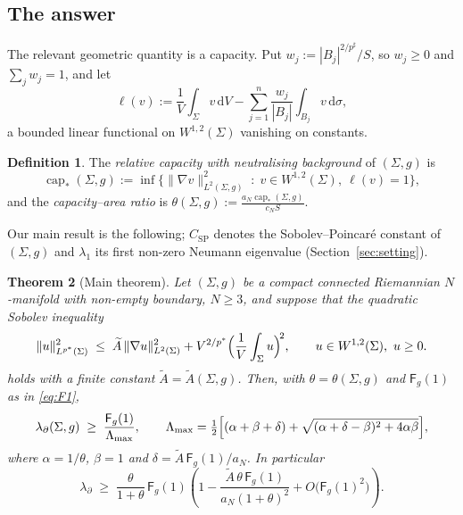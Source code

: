 \documentclass[11pt,reqno]{amsart}
\theoremstyle{plain}
\newtheorem{theorem}{Theorem}[section]
\theoremstyle{definition}
\newtheorem{definition}[theorem]{Definition}
\newcommand{\aN}{a_N}
\newcommand{\cN}{c_N}
\newcommand{\pstar}{p^{*}}
\newcommand{\psharp}{p^{\sharp}}
\newcommand{\cpstar}{\operatorname{cap}_{*}}
\newcommand{\Fq}{\mathsf{F}}
\newcommand{\Csp}{C_{\mathrm{SP}}}
\newcommand{\Atil}{\widetilde{A}}
\newcommand{\dd}{\,\mathrm{d}}
\begin{document}
\subsection{The answer}
The relevant geometric quantity is a capacity. Put
$w_j:=|B_j|^{2/\psharp}/S$, so $w_j\ge0$ and $\sum_jw_j=1$, and let
\begin{equation}
\label{eq:ell}
  \ell(v):=\frac1V\int_\Sigma v\dd V-\sum_{j=1}^{n}\frac{w_j}{|B_j|}\int_{B_j}v\dd\sigma ,
\end{equation}
a bounded linear functional on $W^{1,2}(\Sigma)$ vanishing on constants.

\begin{definition}
\label{def:capstar}
The \emph{relative capacity with neutralising background} of $(\Sigma,g)$ is
\begin{equation}
\label{eq:capstar}
  \cpstar(\Sigma,g):=\inf\bigl\{\|\nabla v\|^2_{L^2(\Sigma,g)}\;:\;
        v\in W^{1,2}(\Sigma),\ \ell(v)=1\bigr\},
\end{equation}
and the \emph{capacity--area ratio} is
$\displaystyle\theta(\Sigma,g):=\frac{\aN\cpstar(\Sigma,g)}{\cN S}$.
\end{definition}

Our main result is the following; $\Csp$ denotes the Sobolev--Poincaré constant of
$(\Sigma,g)$ and $\lambda_1$ its first non-zero Neumann eigenvalue
(Section~\ref{sec:setting}).

\begin{theorem}[Main theorem]
\label{thm:main}
Let $(\Sigma,g)$ be a compact connected Riemannian $N$-manifold with non-empty
boundary, $N\ge3$, and suppose that the quadratic Sobolev inequality
\begin{equation}
\label{eq:star}
  \|u\|^2_{L^{\pstar}(\Sigma)}\;\le\;\Atil\,\|\nabla u\|^2_{L^2(\Sigma)}
        +V^{2/\pstar}\Bigl(\frac1V\int_\Sigma u\Bigr)^{\!2},
  \qquad u\in W^{1,2}(\Sigma),\ u\ge0.
\end{equation}
holds with a finite constant $\Atil=\Atil(\Sigma,g)$. Then, with
$\theta=\theta(\Sigma,g)$ and $\Fq_g(1)$ as in \eqref{eq:F1},
\begin{equation}
\label{eq:main}
  \lambda_\partial(\Sigma,g)\;\ge\;\frac{\Fq_g(1)}{\Lambda_{\max}},
  \qquad
  \Lambda_{\max}=\tfrac12\Bigl[(\alpha+\beta+\delta)
      +\sqrt{(\alpha+\delta-\beta)^2+4\alpha\beta}\Bigr],
\end{equation}
where $\alpha=1/\theta$, $\beta=1$ and $\delta=\Atil\,\Fq_g(1)/\aN$. In
particular
\begin{equation}
\label{eq:main-asymp}
  \lambda_\partial\;\ge\;\frac{\theta}{1+\theta}\,\Fq_g(1)
     \left(1-\frac{\Atil\,\theta\,\Fq_g(1)}{\aN(1+\theta)^2}
            +O\bigl(\Fq_g(1)^2\bigr)\right).
\end{equation}
\end{theorem}
\end{document}
